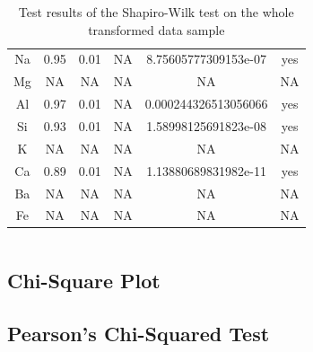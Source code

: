 \documentclass[mathserif,graphics]{beamer}
\begin{document}
{\begin{columns}[t]
\begin{table}[h!]
\begin{tabular}{|cccccc|}
Na & 0.95 & 0.01 & NA & 8.75605777309153e-07 & yes\\ 
Mg & NA & NA & NA & NA & NA\\ 
Al & 0.97 & 0.01 & NA & 0.000244326513056066 & yes\\ 
Si & 0.93 & 0.01 & NA & 1.58998125691823e-08 & yes\\ 
K & NA & NA & NA & NA & NA\\ 
Ca & 0.89 & 0.01 & NA & 1.13880689831982e-11 & yes\\ 
Ba & NA & NA & NA & NA & NA\\ 
Fe & NA & NA & NA & NA & NA\\ \hline \end{tabular}
\caption{\scriptsize Test results of the Shapiro-Wilk test on the whole
transformed data sample}
\end{table}
\vspace{15cm}
\end{columns}
}

\subsection{Chi-Square Plot}

\subsection{Pearson's Chi-Squared Test}
\end{document}
